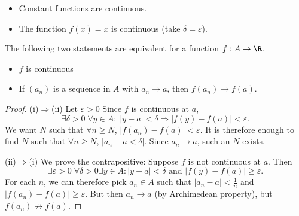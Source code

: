 \documentclass[a4paper]{article}
\begin{document}
\begin{eg}\leavevmode
  \begin{itemize}
    \item Constant functions are continuous.
    \item The function $f(x) = x$ is continuous (take $\delta = \varepsilon$).
  \end{itemize}
\end{eg}

\begin{lemma}
  The following two statements are equivalent for a function $f: A\to \R$.
  \begin{itemize}
    \item $f$ is continuous
    \item If $(a_n)$ is a sequence in $A$ with $a_n \to a$, then $f(a_n) \to f(a)$.
  \end{itemize}
\end{lemma}

\begin{proof}
  (i)$\Rightarrow$(ii) Let $\varepsilon > 0$ Since $f$ is continuous at $a$,
  \[
    \exists \delta > 0\; \forall y\in A:\; |y-a|< \delta \Rightarrow |f(y) - f(a)| < \varepsilon.
  \]
  We want $N$ such that $\forall n \geq N$, $|f(a_n) - f(a)| < \varepsilon$. It is therefore enough to find $N$ such that $\forall n\geq N$, $|a_n - a < \delta|$. Since $a_n \to a$, such an $N$ exists.

  (ii)$\Rightarrow$(i) We prove the contrapositive: Suppose $f$ is not continuous at $a$. Then
  \[
    \exists \varepsilon > 0\;\forall \delta > 0 \exists y\in A: |y - a| < \delta \text{ and }|f(y) - f(a)| \geq \varepsilon.
  \]
  For each $n$, we can therefore pick $a_n \in A$ such that $|a_n - a| < \frac{1}{n}$ and $|f(a_n) - f(a)| \geq \varepsilon$. But then $a_n \to a$ (by Archimedean property), but $f(a_n) \not\to f(a)$.
\end{proof}
\end{document}
